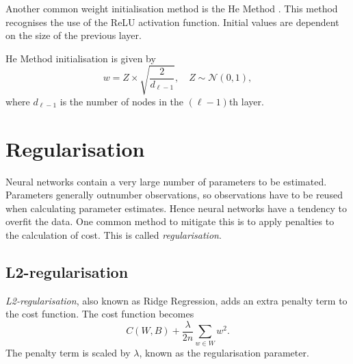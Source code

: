 Another common weight initialisation method is the He Method \cite{HeKaiming2015DDiR}. This method recognises the use of the ReLU activation function. Initial values are dependent on the size of the previous layer.

He Method initialisation is given by
\[
	w = Z\times\sqrt{\dfrac{2}{d_{\ell-1}}},\quad Z\sim\mathcal{N}(0,1),
\]
where $d_{\ell-1}$ is the number of nodes in the $(\ell-1)$th layer.



\section{Regularisation}\label{nnet-reg}

Neural networks contain a very large number of parameters to be estimated. Parameters generally outnumber observations, so observations have to be reused when calculating parameter estimates. Hence neural networks have a tendency to overfit the data. One common method to mitigate this is to apply penalties to the calculation of cost. This is called \textit{regularisation}.

\subsection*{L2-regularisation}\label{nnet-l2reg}


\textit{L2-regularisation}, also known as Ridge Regression, adds an extra penalty term to the cost function. The cost function becomes
\[
	C(W,B) + \dfrac{\lambda}{2n}\sum_{w\in W}w^2.
\]
The penalty term is scaled by $\lambda$, known as the regularisation parameter. 

